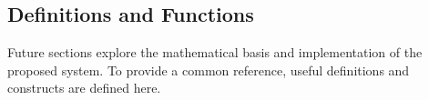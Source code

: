 \subsection{Definitions and Functions}

Future sections explore the mathematical basis and implementation of the proposed system. To provide a common reference, useful definitions and constructs are defined here.

\newcommand{\viewpoint}{\ensuremath{v}}
\newcommand{\viewpointdomain}{\ensuremath{V}}
\newcommand{\dmin}{\ensuremath{d_{\text{min}}}}
\newcommand{\dmax}{\ensuremath{d_{\text{max}}}}
\newcommand{\observation}{\ensuremath{o}}
\newcommand{\observations}[1]{\ensuremath{\boldsymbol{O}^{#1}}}
\newcommand{\pe}{\ensuremath{P(E)}}
\newcommand{\estpe}{\ensuremath{\hat{P}(E)}}
\newcommand{\ps}{\ensuremath{P(S,v)}}
\newcommand{\psge}{\ensuremath{P(S,v|E)}}
\newcommand{\estpsge}{\ensuremath{\hat{P}(S,v|E)}}
\newcommand{\psgne}{\ensuremath{P(S,v|\lnot E)}}
\newcommand{\pegs}{\ensuremath{P(E|S,v)}}
\newcommand{\pegns}{\ensuremath{P(E|\lnot S,v)}}
\newcommand{\falsepos}{\ensuremath{\varepsilon_{\text{pos}}}}
\newcommand{\falseneg}{\ensuremath{\varepsilon_{\text{neg}}}}
\newcommand{\damping}{\ensuremath{\alpha}}
\newcommand{\observability}{\ensuremath{\rho}}
\newcommand{\observabilityupdate}{\ensuremath{\eta}}
\newcommand{\state}{\ensuremath{s}}
\newcommand{\feedback}{\ensuremath{\beta}}
\newcommand{\params}[1]{\ensuremath{\boldsymbol{\theta}_{#1}}}
\newcommand{\param}[2]{\ensuremath{\theta_{#1,#2}}}
\newcommand{\epe}{\ensuremath{\text{EPE}}}
\newcommand{\vbee}{\ensuremath{\text{VBEE}}}
\newcommand{\knn}{\ensuremath{\text{KNN}}}
\newcommand{\db}{\ensuremath{\text{DB}}}
\newcommand{\initialize}[1]{\ensuremath{\operatorname{Initialize}(#1)}}
\newcommand{\estimate}[1]{\ensuremath{\operatorname{Estimate}(#1)}}
\newcommand{\integrate}[1]{\ensuremath{\operatorname{Integrate}(#1)}}
\newcommand{\update}[1]{\ensuremath{\operatorname{Update}(#1)}}
\newcommand{\query}{\ensuremath{\operatorname{Query}()}}
\newcommand{\athreshold}{\ensuremath{\tau_{\text{angle}}}}
\newcommand{\feedbackthreshold}{\ensuremath{\tau_{\beta}}}
\newcommand{\existsthreshold}{\ensuremath{\tau_{E}}}

